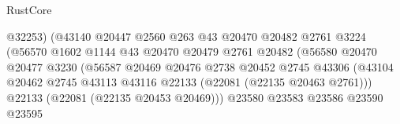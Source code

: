 \begin{lexlean}{RustCore}
\begin{coremodule}
                                                  @32253)
                                                (@43140
                                                  @20447
                                                  @2560
                                                  @263
                                                  @43
                                                  @20470
                                                  @20482
                                                  @2761
                                                  @3224
                                                  (@56570
                                                    @1602
                                                    @1144
                                                    @43
                                                    @20470
                                                    @20479
                                                    @2761
                                                    @20482
                                                    (@56580
                                                      @20470
                                                      @20477
                                                      @3230
                                                      (@56587
                                                        @20469
                                                        @20476
                                                        @2738
                                                        @20452
                                                        @2745
                                                        @43306
                                                        (@43104
                                                          @20462
                                                          @2745
                                                          @43113
                                                          @43116
                                                          @22133
                                                          (@22081 (@22135 @20463 @2761)))
                                                        @22133
                                                        (@22081 (@22135 @20453 @20469)))
                                                      @23580
                                                      @23583
                                                      @23586
                                                      @23590
                                                      @23595

\end{coremodule}
\end{lexlean}
